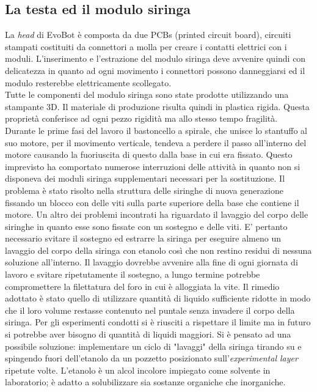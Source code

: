 \subsection{La testa ed il modulo siringa}
La \emph{head} di EvoBot è composta da due PCBs (printed circuit board), circuiti stampati costituiti da connettori a molla per creare i contatti elettrici con i moduli. L'inserimento e l'estrazione del modulo siringa deve avvenire quindi con delicatezza in quanto ad ogni movimento i connettori possono danneggiarsi ed il modulo resterebbe elettricamente scollegato.
\\Tutte le componenti del modulo siringa sono state prodotte utilizzando una stampante 3D. Il materiale di produzione risulta quindi in plastica rigida. Questa proprietà conferisce ad ogni pezzo rigidità ma allo stesso tempo fragilità.
\\Durante le prime fasi del lavoro il bastoncello a spirale, che unisce lo stantuffo al suo motore, per il movimento verticale, tendeva a perdere il passo all'interno del motore causando la fuoriuscita di questo dalla base in cui era fissato. 
Questo imprevisto ha comportato numerose interruzioni delle attività in quanto non si disponeva dei moduli siringa supplementari necessari per la sostituzione. Il problema è stato risolto nella struttura delle siringhe di nuova generazione fissando un blocco con delle viti sulla parte superiore della base che contiene il motore. 
Un altro dei problemi incontrati ha riguardato il lavaggio del corpo delle siringhe in quanto esse sono fissate con un sostegno e delle viti. E’ pertanto necessario svitare il sostegno ed estrarre la siringa per eseguire almeno un lavaggio del corpo della siringa con etanolo così che non restino residui di nessuna soluzione all'interno. Il lavaggio dovrebbe avvenire alla fine di ogni giornata di lavoro e svitare ripetutamente il sostegno, a lungo termine potrebbe compromettere la filettatura del foro in cui è alloggiata la vite. Il rimedio adottato è stato quello di utilizzare quantità di liquido sufficiente ridotte in modo che il loro volume restasse contenuto nel puntale senza invadere il corpo della siringa. Per gli esperimenti condotti si è riusciti a rispettare il limite ma in futuro si potrebbe aver bisogno di quantità di liquidi maggiori. Si è pensato ad una possibile soluzione: implementare un ciclo di "lavaggi" della siringa tirando su e spingendo fuori dell'etanolo da un pozzetto posizionato sull'\emph{experimental layer} ripetute volte. L'etanolo è un alcol incolore impiegato come solvente in laboratorio; è adatto a solubilizzare sia sostanze organiche che inorganiche. 
